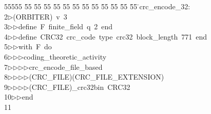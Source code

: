 %
%
\begin{tabbing}
55555 \= 55 \= 55 \= 55 \= 55 \= 55 \= 55 \= 55 \= 55 \= 55 \= 55 \= 55 \= 55 \= \>crc\_encode\_32:\\[0pt]
2\>$\triangleright$\>(ORBITER)\ v\ 3\ \\[0pt]
3\>$\triangleright$\>$\triangleright$\>define\ F\ finite\_field\ q\ 2\ end\ \\[0pt]
4\>$\triangleright$\>$\triangleright$\>define\ CRC32\ crc\_code\ type\ crc32\ block\_length\ 771\ end\ \\[0pt]
5\>$\triangleright$\>$\triangleright$\>with\ F\ do\ \\[0pt]
6\>$\triangleright$\>$\triangleright$\>$\triangleright$\>coding\_theoretic\_activity\ \\[0pt]
7\>$\triangleright$\>$\triangleright$\>$\triangleright$\>$\triangleright$\>crc\_encode\_file\_based\ \\[0pt]
8\>$\triangleright$\>$\triangleright$\>$\triangleright$\>$\triangleright$\>(CRC\_FILE)(CRC\_FILE\_EXTENSION)\ \\[0pt]
9\>$\triangleright$\>$\triangleright$\>$\triangleright$\>$\triangleright$\>(CRC\_FILE)\_crc32bin\ CRC32\ \\[0pt]
10\>$\triangleright$\>$\triangleright$\>end\\[0pt]
11\>\end{tabbing}
